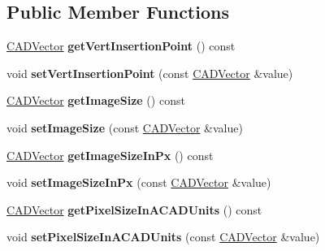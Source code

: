 \subsection*{Public Member Functions}
\begin{DoxyCompactItemize}
\item 
\hyperlink{class_c_a_d_vector}{C\+A\+D\+Vector} {\bfseries get\+Vert\+Insertion\+Point} () const \hypertarget{class_c_a_d_image_a0d801f1e4f26c493d30b77124c04d9e8}{}\label{class_c_a_d_image_a0d801f1e4f26c493d30b77124c04d9e8}

\item 
void {\bfseries set\+Vert\+Insertion\+Point} (const \hyperlink{class_c_a_d_vector}{C\+A\+D\+Vector} \&value)\hypertarget{class_c_a_d_image_ad44b9711c05eee17f0cfb0bb60f7970b}{}\label{class_c_a_d_image_ad44b9711c05eee17f0cfb0bb60f7970b}

\item 
\hyperlink{class_c_a_d_vector}{C\+A\+D\+Vector} {\bfseries get\+Image\+Size} () const \hypertarget{class_c_a_d_image_aaa76930e115facb70310199360786da4}{}\label{class_c_a_d_image_aaa76930e115facb70310199360786da4}

\item 
void {\bfseries set\+Image\+Size} (const \hyperlink{class_c_a_d_vector}{C\+A\+D\+Vector} \&value)\hypertarget{class_c_a_d_image_a806094956012bbfe4b3cd3123f1da75b}{}\label{class_c_a_d_image_a806094956012bbfe4b3cd3123f1da75b}

\item 
\hyperlink{class_c_a_d_vector}{C\+A\+D\+Vector} {\bfseries get\+Image\+Size\+In\+Px} () const \hypertarget{class_c_a_d_image_af111d15469ad9f41f85b8f7f39e22b82}{}\label{class_c_a_d_image_af111d15469ad9f41f85b8f7f39e22b82}

\item 
void {\bfseries set\+Image\+Size\+In\+Px} (const \hyperlink{class_c_a_d_vector}{C\+A\+D\+Vector} \&value)\hypertarget{class_c_a_d_image_a4b6631ac8973ed25f40e9b5369f068da}{}\label{class_c_a_d_image_a4b6631ac8973ed25f40e9b5369f068da}

\item 
\hyperlink{class_c_a_d_vector}{C\+A\+D\+Vector} {\bfseries get\+Pixel\+Size\+In\+A\+C\+A\+D\+Units} () const \hypertarget{class_c_a_d_image_afdaf3bfebbad316f6add46c64bea59e1}{}\label{class_c_a_d_image_afdaf3bfebbad316f6add46c64bea59e1}

\item 
void {\bfseries set\+Pixel\+Size\+In\+A\+C\+A\+D\+Units} (const \hyperlink{class_c_a_d_vector}{C\+A\+D\+Vector} \&value)\hypertarget{class_c_a_d_image_a1bc2f6b57b11ac1d7afd5f24cadbf4c7}{}\label{class_c_a_d_image_a1bc2f6b57b11ac1d7afd5f24cadbf4c7}


\end{DoxyCompactItemize}
